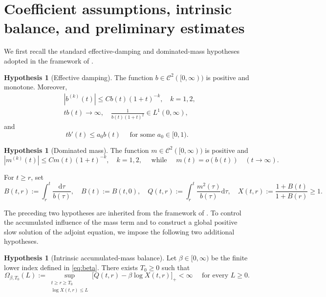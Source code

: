 \documentclass[11pt,reqno]{amsart}
\theoremstyle{definition}
\newtheorem{hypothesis}[theorem]{Hypothesis}
\theoremstyle{remark}
\begin{document}
	\section{Coefficient assumptions, intrinsic balance, and preliminary estimates} \label{sec:coefficients}
	
	We first recall the standard effective-damping and dominated-mass hypotheses adopted in the framework of \cite{DGR2019}.
	
	\begin{hypothesis}[Effective damping]
		\label{ass:b}
		The function $b\in \mathcal{C}^2([0,\infty))$ is positive and monotone. Moreover,
		\begin{align}
			\label{eq:b-der}
			&|b^{(k)}(t)|\leq Cb(t)(1+t)^{-k},
			\quad k=1,2, \\
			\label{eq:b-eff}
			&tb(t)\longrightarrow\infty,
			\quad
			\frac{1}{b(t)(1+t)^2}\in L^1(0,\infty),
		\end{align}
		and
		\begin{equation}
			\label{eq:b-growth}
			tb'(t)\leq a_0b(t)
			\quad \text{ for some } a_0\in[0,1).
		\end{equation}
	\end{hypothesis}
	
	\begin{hypothesis}[Dominated mass]
		\label{ass:m}
		The function $m\in \mathcal{C}^2([0,\infty))$ is positive and
		$$
		|m^{(k)}(t)|\leq Cm(t)(1+t)^{-k},
		\quad k=1,2, \quad \text{ while } \quad m(t)=o(b(t))
		\quad(t\to\infty).
		$$
	\end{hypothesis}
	
	For $t\geq r$, set
	$$
	B(t,r):=\int_r^t\frac{\mathrm{d}\tau}{b(\tau)},
	\quad
	B(t):=B(t,0),
	\quad
	Q(t,r):=\int_r^t\frac{m^2(\tau)}{b(\tau)}\mathrm{d}\tau, \quad
	X(t,r):=\frac{1+B(t)}{1+B(r)}\geq1.
	$$
	
	The preceding two hypotheses are inherited from the framework of
	\cite{DGR2019}. To control the accumulated influence of the mass term
	and to construct a global positive slow solution of the adjoint
	equation, we impose the following two additional hypotheses.
	
	\begin{hypothesis}[Intrinsic accumulated-mass balance]
		\label{ass:balance}
		Let $\beta\in[0,\infty)$ be the finite lower index defined in \eqref{eq:beta}. There exists $T_0\geq0$ such that
		$$
		\Omega_{\beta,T_0}(L):=
		\sup_{\substack{t\geq r\geq T_0\\
				\log X(t,r)\leq L}}
		\bigl[Q(t,r)-\beta\log X(t,r)\bigr]_+<\infty
		\quad \text{ for every } L\geq0.
		$$
	\end{hypothesis}
	
\end{document}

